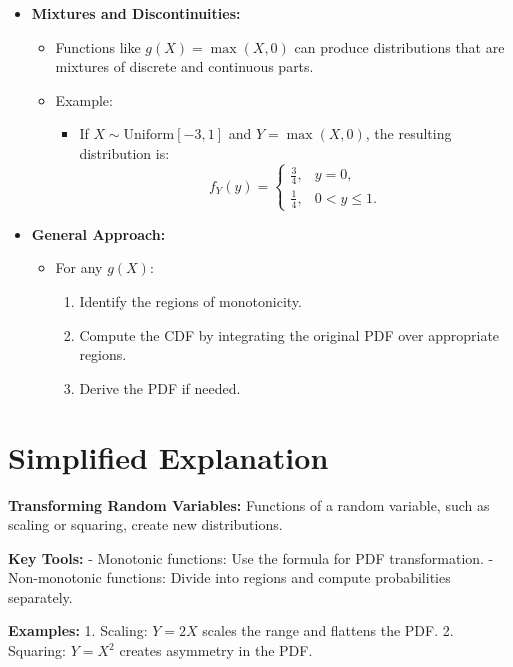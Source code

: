\documentclass{article}
\begin{document}
\begin{itemize}
  \item \textbf{Mixtures and Discontinuities:}
    \begin{itemize}
      \item Functions like $g(X) = \max(X, 0)$ can produce distributions that are mixtures of discrete and continuous parts.
      \item Example:
        \begin{itemize}
          \item If $X \sim \text{Uniform}[-3, 1]$ and $Y = \max(X, 0)$, the resulting distribution is:
            \[
              f_Y(y) =
              \begin{cases}
                \frac{3}{4}, & y = 0, \\
                \frac{1}{4}, & 0 < y \leq 1.
              \end{cases}
            \]
        \end{itemize}
    \end{itemize}

  \item \textbf{General Approach:}
    \begin{itemize}
      \item For any $g(X)$:
        \begin{enumerate}
          \item Identify the regions of monotonicity.
          \item Compute the CDF by integrating the original PDF over appropriate regions.
          \item Derive the PDF if needed.
        \end{enumerate}
    \end{itemize}
\end{itemize}

\section*{Simplified Explanation}

\textbf{Transforming Random Variables:}
Functions of a random variable, such as scaling or squaring, create new distributions.

\textbf{Key Tools:}
- Monotonic functions: Use the formula for PDF transformation.
- Non-monotonic functions: Divide into regions and compute probabilities separately.

\textbf{Examples:}
1. Scaling: $Y = 2X$ scales the range and flattens the PDF.
2. Squaring: $Y = X^2$ creates asymmetry in the PDF.
\end{document}
